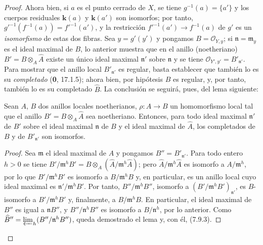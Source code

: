 \begin{proof}
Ahora bien, si $a$ es el punto cerrado de $X$, se tiene
$g^{-1}(a)=\{a'\}$ y los cuerpos residuales $\boldsymbol{k}(a)$ y $\boldsymbol{k}(a')$ son
isomorfos; por tanto, $g'^{-1}(f^{-1}(a))=f'^{-1}(a')$, y la restricción
$f'^{-1}(a')\to f^{-1}(a)$ de $g'$ es un \emph{isomorfismo} de estas
dos fibras. Sea $y=g'(y')$ y pongamos $B=\mathcal O_{Y,y}$; si
$\mathfrak n=\mathfrak m_y$ es el ideal maximal de $B$, lo anterior
muestra que en el anillo (noetheriano) $B'=B\otimes_A\widehat A$
existe un único ideal maximal $\mathfrak n'$ sobre $\mathfrak n$ y
se tiene $\mathcal O_{Y',y'}=B'_{\mathfrak n'}$. Para mostrar que el
anillo local $B'_{\mathfrak n'}$ es regular, basta establecer que
también lo es su \emph{completado} (\textbf 0, 17.1.5); ahora bien, por hipótesis
$B$ es regular, y, por tanto, también lo es su completado $\widehat B$.
La conclusión se seguirá, pues, del lema siguiente:

\begin{lemma}[7.9.3.1]
\label{IV.2.s7.9.3.1-fr}
Sean $A$, $B$ dos anillos locales noetherianos,
$\rho:A\to B$ un homomorfismo local tal que el anillo
$B'=B\otimes_A\widehat A$ sea noetheriano. Entonces, para todo ideal
maximal $\mathfrak n'$ de $B'$ sobre el ideal maximal $\mathfrak n$
de $B$ y el ideal maximal de $\widehat A$, los completados de $B$
y de $B'_{\mathfrak n'}$ son isomorfos.
\end{lemma}

\begin{proof}
Sea $\mathfrak m$ el ideal maximal de $A$ y pongamos
$B''=B'_{\mathfrak n'}$. Para todo entero $h>0$ se tiene
$B'/\mathfrak m^hB'=B\otimes_A(\widehat A/\mathfrak m^h\widehat A)$;
pero $\widehat A/\mathfrak m^h\widehat A$ es isomorfo a
$A/\mathfrak m^h$, por lo que $B'/\mathfrak m^hB'$ es isomorfo a
$B/\mathfrak m^hB$ y, en particular, es un anillo local cuyo ideal
maximal es $\mathfrak n'/\mathfrak m^hB'$. Por tanto,
$B''/\mathfrak m^hB''$, isomorfo a
$(B'/\mathfrak m^hB')_{\mathfrak n'}$, es $B$-isomorfo a
$B'/\mathfrak m^hB'$ y, finalmente, a $B/\mathfrak m^hB$.
En particular, el ideal maximal de $B''$ es igual a $\mathfrak nB''$,
y $B''/\mathfrak n^hB''$ es isomorfo a $B/\mathfrak n^h$, por lo
anterior. Como $\widehat{B}''=\varprojlim_h(B''/\mathfrak n^hB'')$,
queda demostrado el lema y, con él, (7.9.3).
\end{proof}
\end{proof}
